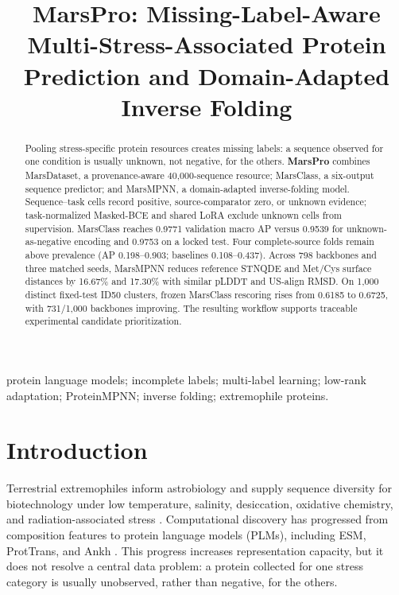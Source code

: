 \documentclass[conference]{IEEEtran}
\title{MarsPro: Missing-Label-Aware Multi-Stress-Associated Protein Prediction and Domain-Adapted Inverse Folding}
\author{}
\begin{document}
\maketitle



\begin{abstract}
Pooling stress-specific protein resources creates missing labels: a sequence observed for one condition is usually unknown, not negative, for the others. \textbf{MarsPro} combines MarsDataset, a provenance-aware 40,000-sequence resource; MarsClass, a six-output sequence predictor; and MarsMPNN, a domain-adapted inverse-folding model. Sequence--task cells record positive, source-comparator zero, or unknown evidence; task-normalized Masked-BCE and shared LoRA exclude unknown cells from supervision. MarsClass reaches 0.9771 validation macro AP versus 0.9539 for unknown-as-negative encoding and 0.9753 on a locked test. Four complete-source folds remain above prevalence (AP 0.198--0.903; baselines 0.108--0.437). Across 798 backbones and three matched seeds, MarsMPNN reduces reference STNQDE and Met/Cys surface distances by 16.67\% and 17.30\% with similar pLDDT and US-align RMSD. On 1,000 distinct fixed-test ID50 clusters, frozen MarsClass rescoring rises from 0.6185 to 0.6725, with 731/1,000 backbones improving. The resulting workflow supports traceable experimental candidate prioritization.
\end{abstract}

\begin{IEEEkeywords}protein language models; incomplete labels; multi-label learning; low-rank adaptation; ProteinMPNN; inverse folding; extremophile proteins.\end{IEEEkeywords}

\section{Introduction}\label{sec:intro}

Terrestrial extremophiles inform astrobiology and supply sequence diversity for biotechnology under low temperature, salinity, desiccation, oxidative chemistry, and radiation-associated stress \cite{ref14,ref15,ref31,ref32}. Computational discovery has progressed from composition features to protein language models (PLMs), including ESM, ProtTrans, and Ankh \cite{ref16,ref2,ref17}. This progress increases representation capacity, but it does not resolve a central data problem: a protein collected for one stress category is usually unobserved, rather than negative, for the others.
\end{document}
